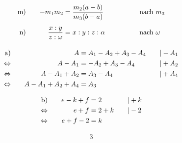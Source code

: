 \begin{exercise}
\begin{alignat*}{4}
      \exnum{m)}&\quad &          -m_{1}m_{2}&=\frac{m_{2}(a-b)}{m_{3}(b-a)}             & \quad&\quad & \quad&\text{nach $m_{3}$}           \\
      \exnum{n)}&\quad & \frac{x:y}{z:\omega}&=x:y:z:\alpha                              & \quad&\quad & \quad&\text{nach $\omega$}
    \end{alignat*}
  \fi
  \ifoutcome\outcome\par
    \vspace*{-2\abovedisplayskip}%
    \begin{minipage}[t]{0.59\linewidth}
      \makeatletter\@fleqntrue\makeatother
      \begin{alignat*}{3}
        \text{a)}&\quad
        &
        A&=A_{1}-A_{2}+A_{3}-A_{4}
        &
        \quad&|-A_{1}
        \\
        \Leftrightarrow&\quad
        &
        A-A_{1}&=-A_{2}+A_{3}-A_{4}
        &
        \quad&|+A_{2}
        \\
        \Leftrightarrow&\quad
        &
        A-A_{1}+A_{2}&=A_{3}-A_{4}
        &
        \quad&|+A_{4}
        \\
        \Leftrightarrow&\quad
        &
        A-A_{1}+A_{2}+A_{4}&=A_{3}
        &
        \quad&\relax
      \end{alignat*}
    \end{minipage}\hfill
    \begin{minipage}[t]{0.34\linewidth}
      \makeatletter\@fleqntrue\makeatother
      \begin{alignat*}{3}
        \text{b)}&\quad
        &
        e-k+f&=2
        &
        \quad&|+k
        \\
        \Leftrightarrow&\quad
        &
        e+f&=2+k
        &
        \quad&|-2
        \\
        \Leftrightarrow&\quad
        &
        e+f-2&=k
        &
        \quad&\relax
      \end{alignat*}
    \end{minipage}\par
    \begin{minipage}[t]{0.47\linewidth}
      \makeatletter\@fleqntrue\makeatother
      \begin{alignat*}{3}

\end{alignat*}
\end{minipage}
\end{exercise}
